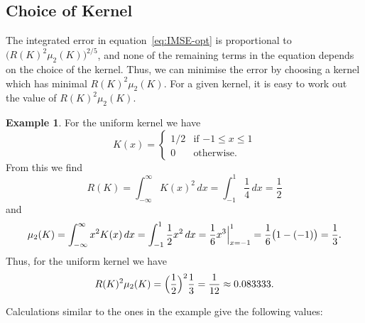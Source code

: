 \documentclass[
  a4paper,
]{article}
\theoremstyle{definition}
\theoremstyle{definition}
\newtheorem{example}{Example}[section]
\theoremstyle{definition}
\theoremstyle{definition}
\theoremstyle{remark}
\begin{document}
\subsection{Choice of Kernel}\label{choice-of-kernel}

The integrated error in equation~\eqref{eq:IMSE-opt} is proportional to
\(\bigl( R(K)^2 \mu_2(K) \bigr)^{2/5}\), and none of the remaining terms in
the equation depends on the choice of the kernel. Thus, we can minimise
the error by choosing a kernel which has minimal \(R(K)^2 \mu_2(K)\).
For a given kernel, it is easy to work out the value of \(R(K)^2 \mu_2(K)\).

\begin{example}
For the uniform kernel we have
\begin{equation*}
  K(x)
  = \begin{cases}
      1/2 & \mbox{if $-1 \leq x \leq 1$} \\
      0 & \mbox{otherwise.}
    \end{cases}
\end{equation*}
From this we find
\begin{equation*}
  R(K)
  = \int_{-\infty}^\infty K(x)^2 \,dx
  = \int_{-1}^1 \frac14 \,dx
  = \frac12
\end{equation*}
and
\begin{equation*}
  \mu_2(K)
  = \int_{-\infty}^\infty x^2 K(x) \,dx
  = \int_{-1}^1 \frac12 x^2 \,dx
  = \frac16 \Bigl. x^3 \Bigr|_{x=-1}^1
  = \frac16 \bigl( 1 - (-1) \bigr)
  = \frac13.
\end{equation*}
Thus, for the uniform kernel we have
\begin{equation*}
  R(K)^2 \mu_2(K)
  = \Bigl( \frac12 \Bigr)^2 \frac13
  = \frac{1}{12}
  \approx 0.083333.
\end{equation*}
\end{example}

Calculations similar to the ones in the example give the following
values:
\end{document}
